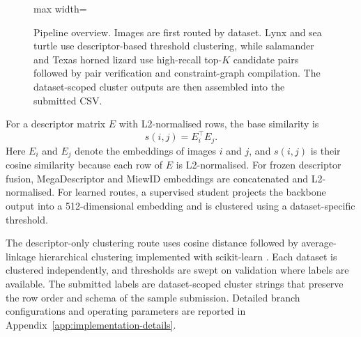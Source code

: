 \documentclass{ceurart}
\begin{document}
\begin{figure}[ht]
\begin{adjustbox}{max width=\linewidth}
  \end{adjustbox}
  \caption{Pipeline overview. Images are first routed by dataset. Lynx and sea turtle use descriptor-based threshold clustering, while salamander and Texas horned lizard use high-recall top-$K$ candidate pairs followed by pair verification and constraint-graph compilation. The dataset-scoped cluster outputs are then assembled into the submitted CSV.}
  \label{fig:overview}
\end{figure}

For a descriptor matrix $E$ with L2-normalised rows, the base similarity is
\begin{equation}
  s(i,j)=E_i^\top E_j .
\end{equation}
Here $E_i$ and $E_j$ denote the embeddings of images $i$ and $j$, and $s(i,j)$ is their cosine similarity because each row of $E$ is L2-normalised.
For frozen descriptor fusion, MegaDescriptor and MiewID embeddings are concatenated and L2-normalised. For learned routes, a supervised student projects the backbone output into a 512-dimensional embedding and is clustered using a dataset-specific threshold.

The descriptor-only clustering route uses cosine distance followed by average-linkage hierarchical clustering implemented with scikit-learn \cite{scikit-learn}. Each dataset is clustered independently, and thresholds are swept on validation where labels are available. The submitted labels are dataset-scoped cluster strings that preserve the row order and schema of the sample submission. Detailed branch configurations and operating parameters are reported in Appendix~\ref{app:implementation-details}.
\end{document}
